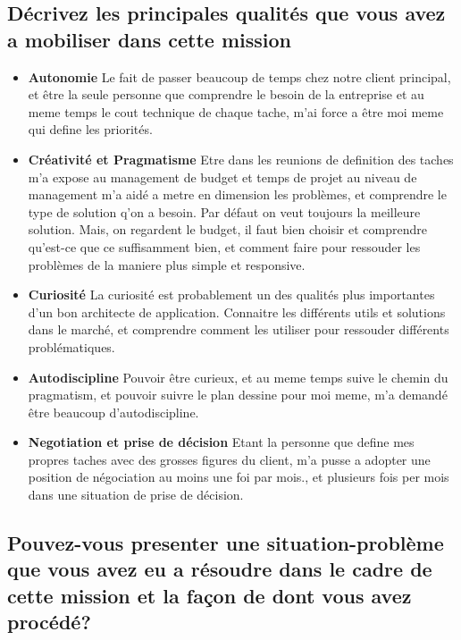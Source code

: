 \documentclass{resume} %
\begin{document}
	\subsection{Décrivez les principales qualités que vous avez a mobiliser dans cette mission}
	
		\begin{itemize} 				
			\item \textbf{Autonomie} \newline
				Le fait de passer beaucoup de temps chez notre client principal, et être la seule personne que comprendre le besoin de la entreprise et au meme temps le cout technique de chaque tache, m'ai force a être moi meme qui define les priorités. 
			\item \textbf{Créativité et Pragmatisme } \newline
				Etre dans les reunions de definition des taches m'a expose au management de budget et temps de projet au niveau de management m'a aidé a metre en dimension les problèmes, et comprendre le type de solution q'on a besoin. Par défaut on veut toujours la meilleure solution. Mais, on regardent le budget, il faut bien choisir et comprendre qu'est-ce que ce suffisamment bien, et comment faire pour ressouder les problèmes de la maniere plus simple et responsive. 
			\item \textbf{Curiosité } \newline
				La curiosité est probablement un des qualités plus importantes d'un bon architecte de application. Connaitre les différents utils et solutions dans le marché, et comprendre comment les utiliser pour ressouder différents problématiques.
			\item \textbf{Autodiscipline} \newline
				Pouvoir être curieux, et au meme temps suive le chemin du pragmatism, et pouvoir suivre le plan dessine pour moi meme, m'a demandé être  beaucoup d'autodiscipline.
			\item \textbf{Negotiation  et prise de décision } \newline
				Etant la personne que define mes propres taches avec des grosses figures du client, m'a pusse a adopter une position de négociation au moins une foi par mois., et plusieurs fois per mois dans une situation de prise de décision.  
		\end{itemize}
		
	\subsection{Pouvez-vous presenter une situation-problème que vous avez eu a résoudre dans le cadre de cette mission et la façon de dont vous avez procédé?}
	
\end{document}
